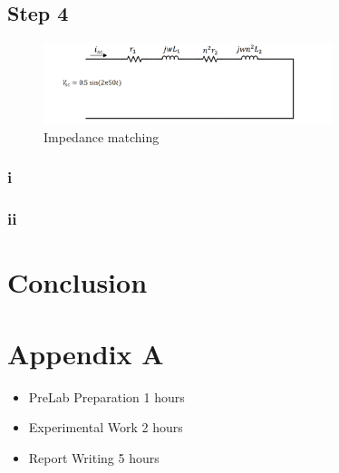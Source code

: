 \documentclass[letterpaper,12pt]{article}
\begin{document}
\subsection{Step 4}
\begin{figure}[H]
    \centering
    \includegraphics[width = 0.75\textwidth]{3.png}
    \caption{Impedance matching}
\end{figure} 

\subsubsection{i}
\subsubsection{ii}


\section{Conclusion}

\section*{Appendix A}
\begin{itemize}
    \item PreLab Preparation 1 hours
    \item Experimental Work 2  hours
    \item Report Writing 5 hours
\end{itemize}
\end{document}
